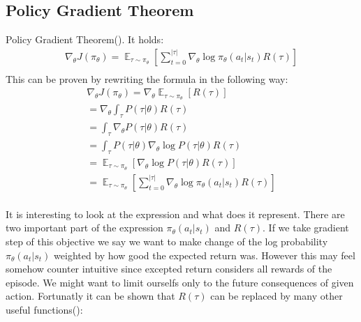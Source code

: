 \subsection{Policy Gradient Theorem}
Policy Gradient Theorem(\cite{sutton2018reinforcement}). It holds: 
\begin{align*}
  \nabla_\theta J(\pi_\theta) = \mathop{\mathbb{E}}_{\tau \sim \pi_\theta}[\sum_{t=0}^{|\tau|} \nabla_\theta \log \pi_\theta(a_t|s_t) R(\tau)] \\
\end{align*}
This can be proven by rewriting the formula in the following way:
\begin{align*}
  \nabla_\theta J(\pi_\theta) = \nabla_\theta \mathop{\mathbb{E}}_{\tau \sim \pi_\theta}[R(\tau)] \\
  = \nabla_\theta \int_{\tau}^{}P(\tau|\theta)R(\tau) \\
  = \int_{\tau}^{} \nabla_\theta P(\tau|\theta)R(\tau) \\
  = \int_{\tau}^{} P(\tau|\theta)\nabla_\theta \log P(\tau|\theta)R(\tau) \\
  = \mathop{\mathbb{E}}_{\tau \sim \pi_\theta}[\nabla_\theta \log P(\tau|\theta)R(\tau)] \\
  = \mathop{\mathbb{E}}_{\tau \sim \pi_\theta}[\sum_{t=0}^{|\tau|}  \nabla_\theta \log \pi_\theta(a_t|s_t) R(\tau)] \\
\end{align*}

It is interesting to look at the expression and what does it represent. 
There are two important part of the expression $\pi_\theta(a_t|s_t)$ and $R(\tau)$.
If we take gradient step of this objective we say we want to make change of the log probability $\pi_\theta(a_t|s_t)$ weighted by how good the expected return was.
However this may feel somehow counter intuitive since excepted return considers all rewards of the episode.
We might want to limit ourselfs only to the future consequences of given action.
Fortunatly it can be shown that $R(\tau)$ can be replaced by many other useful functions(\cite{GAE}):

